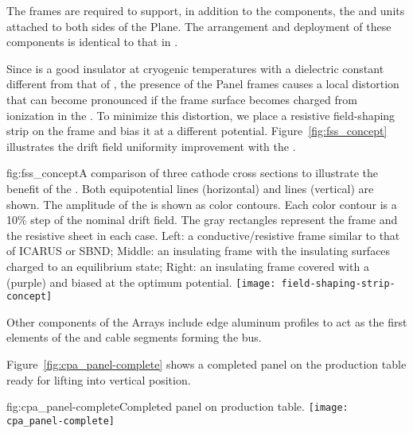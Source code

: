 The  frames are required to support, in addition to the  components, the  and  units attached to both sides of the  Plane. %
The arrangement and deployment of these components is identical to that in .  

 Since \frfour is a good insulator at cryogenic temperatures with a dielectric constant different from that of \lar, the presence of the  Panel frames causes a local \efield distortion that can become pronounced if the frame surface becomes charged 
from ionization in the .  To minimize this distortion, we place a resistive field-shaping strip  on the frame and bias it at a different potential.  Figure~\ref{fig:fss_concept} illustrates the drift field uniformity improvement with the .


\begin{dunefigure}{fig:fss_concept}{A comparison of three cathode cross sections to illustrate the benefit of the . Both equipotential lines (horizontal) and \efield{} lines (vertical) are shown.  The amplitude of the \efield{} is shown as color contours. Each color contour is a 10\% step of the nominal drift field.  The gray rectangles represent the frame and the resistive sheet in each case. Left: a conductive/resistive frame similar to that of ICARUS or SBND; Middle: an insulating frame with the insulating surfaces charged to an equilibrium state; Right: an insulating frame covered with a  (purple) and biased at the optimum potential. }
\texttt{[image: field-shaping-strip-concept]} %
\end{dunefigure}

Other  components of the  Arrays include  edge aluminum profiles to act as the first elements of the  and cable segments forming the  bus.

Figure~\ref{fig:cpa_panel-complete} shows a completed   panel on the production table ready for lifting into vertical position. %

\begin{dunefigure}{fig:cpa_panel-complete}{Completed   panel on production table.}
\texttt{[image: cpa\_panel-complete]}
\end{dunefigure}


